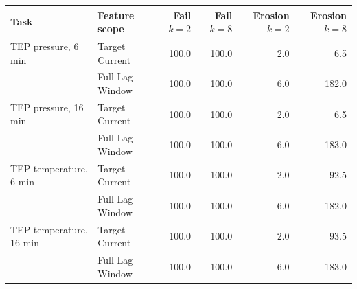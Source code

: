 \begin{tabular}{@{}llrrrr@{}}
\toprule
Task & Feature scope & Fail $k=2$ & Fail $k=8$ & Erosion $k=2$ & Erosion $k=8$ \\
\midrule
TEP pressure, 6 min & Target Current & 100.0 & 100.0 & 2.0 & 6.5 \\
 & Full Lag Window & 100.0 & 100.0 & 6.0 & 182.0 \\
\addlinespace
TEP pressure, 16 min & Target Current & 100.0 & 100.0 & 2.0 & 6.5 \\
 & Full Lag Window & 100.0 & 100.0 & 6.0 & 183.0 \\
\addlinespace
TEP temperature, 6 min & Target Current & 100.0 & 100.0 & 2.0 & 92.5 \\
 & Full Lag Window & 100.0 & 100.0 & 6.0 & 182.0 \\
\addlinespace
TEP temperature, 16 min & Target Current & 100.0 & 100.0 & 2.0 & 93.5 \\
 & Full Lag Window & 100.0 & 100.0 & 6.0 & 183.0 \\
\bottomrule
\end{tabular}

